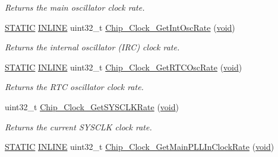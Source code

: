 \begin{DoxyCompactItemize}
\begin{DoxyCompactList}\small\item\em Returns the main oscillator clock rate. \end{DoxyCompactList}\item 
\hyperlink{group__LPC__Types__Public__Macros_ga10b2d890d871e1489bb02b7e70d9bdfb}{S\-T\-A\-T\-I\-C} \hyperlink{group__LPC__Types__Public__Types_ga2eb6f9e0395b47b8d5e3eeae4fe0c116}{I\-N\-L\-I\-N\-E} uint32\-\_\-t \hyperlink{group__CLOCK__17XX__40XX_gaa8db0ad49f51bf5d6870181e77249c2b}{Chip\-\_\-\-Clock\-\_\-\-Get\-Int\-Osc\-Rate} (\hyperlink{Paradigm_2Tern__EE_2small_2portmacro_8h_a14d32f8130d3c0b212cfc751730b5b49}{void})
\begin{DoxyCompactList}\small\item\em Returns the internal oscillator (I\-R\-C) clock rate. \end{DoxyCompactList}\item 
\hyperlink{group__LPC__Types__Public__Macros_ga10b2d890d871e1489bb02b7e70d9bdfb}{S\-T\-A\-T\-I\-C} \hyperlink{group__LPC__Types__Public__Types_ga2eb6f9e0395b47b8d5e3eeae4fe0c116}{I\-N\-L\-I\-N\-E} uint32\-\_\-t \hyperlink{group__CLOCK__17XX__40XX_ga64b01351fd2019749b1f1d18dfd263f0}{Chip\-\_\-\-Clock\-\_\-\-Get\-R\-T\-C\-Osc\-Rate} (\hyperlink{Paradigm_2Tern__EE_2small_2portmacro_8h_a14d32f8130d3c0b212cfc751730b5b49}{void})
\begin{DoxyCompactList}\small\item\em Returns the R\-T\-C oscillator clock rate. \end{DoxyCompactList}\item 
uint32\-\_\-t \hyperlink{group__CLOCK__17XX__40XX_gaec133465745ce56e49b184185f8252e1}{Chip\-\_\-\-Clock\-\_\-\-Get\-S\-Y\-S\-C\-L\-K\-Rate} (\hyperlink{Paradigm_2Tern__EE_2small_2portmacro_8h_a14d32f8130d3c0b212cfc751730b5b49}{void})
\begin{DoxyCompactList}\small\item\em Returns the current S\-Y\-S\-C\-L\-K clock rate. \end{DoxyCompactList}\item 
\hyperlink{group__LPC__Types__Public__Macros_ga10b2d890d871e1489bb02b7e70d9bdfb}{S\-T\-A\-T\-I\-C} \hyperlink{group__LPC__Types__Public__Types_ga2eb6f9e0395b47b8d5e3eeae4fe0c116}{I\-N\-L\-I\-N\-E} uint32\-\_\-t \hyperlink{group__CLOCK__17XX__40XX_gade97c5e68f4609663e247043b48949d9}{Chip\-\_\-\-Clock\-\_\-\-Get\-Main\-P\-L\-L\-In\-Clock\-Rate} (\hyperlink{Paradigm_2Tern__EE_2small_2portmacro_8h_a14d32f8130d3c0b212cfc751730b5b49}{void})

\end{DoxyCompactItemize}
